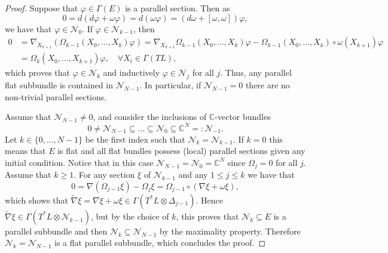 \documentclass{article}
\theoremstyle{remark}
\begin{document}
\begin{proof}
    Suppose that $\varphi\in\Gamma(E)$ is a parallel section. Then as 
    $$0=d(d\varphi+\omega\varphi)=d(\omega\varphi)=(d\omega+[\omega,\omega])\varphi,$$
    we have that $\varphi\in\mathcal{N}_0$. If $\varphi\in\mathcal{N}_{k-1}$, then 
    \begin{align*}
        0&=\nabla_{X_{k+1}}(\Omega_{k-1}(X_0,\ldots,X_k)\varphi)=\nabla_{X_{k+1}}\Omega_{k-1}(X_0,\ldots,X_k)\varphi-\Omega_{k-1}(X_0,\ldots,X_k)\circ\omega(X_{k+1})\varphi\\
        &=\Omega_k(X_0,\ldots,X_{k+1})\varphi,\quad\forall X_i \in\Gamma(TL),
    \end{align*}
    which proves that $\varphi\in \mathcal{N}_k$ and inductively $\varphi\in\mathcal{N}_j$ for all $j$. Thus, any parallel flat subbundle is contained in $\mathcal{N}_{N-1}$. In particular, if $\mathcal{N}_{N-1}=0$ there are no non-trivial parallel sections.
    
    Assume that $\mathcal{N}_{N-1}\neq 0$, and consider the inclusions of $\mathbb{C}$-vector bundles 
    \begin{equation*}
        0\neq\mathcal{N}_{N-1}\subseteq\ldots\subseteq\mathcal{N}_0\subseteq\mathbb{C}^N=:\mathcal{N}_{-1}.
    \end{equation*}
    Let $k\in\{0,\ldots,N-1\}$ be the first index such that $\mathcal{N}_k=\mathcal{N}_{k-1}$. If $k=0$ this means that $E$ is flat and all flat bundles possess (local) parallel sections given any initial condition. Notice that in this case $\mathcal{N}_{N-1}=\mathcal{N}_0=\mathbb{C}^N$ since $\Omega_j=0$ for all $j$. Assume that $k\geq 1$. For any section $\xi$ of $\mathcal{N}_{k-1}$ and any $1\leq j\leq k$ we have that 
    $$0=\nabla(\Omega_{j-1}\xi)-\Omega_j\xi=\Omega_{j-1}\circ(\nabla\xi+\omega\xi),$$
    which shows that $\tilde{\nabla}\xi=\nabla\xi+\omega\xi\in\Gamma(T^{*}L\otimes \Delta_{j-1})$. Hence $\tilde{\nabla}\xi\in\Gamma(T^{*}L\otimes \mathcal{N}_{k-1})$, but by the choice of $k$, this proves that $\mathcal{N}_k\subseteq E$ is a parallel subbundle and then $\mathcal{N}_k\subseteq\mathcal{N}_{N-1}$ by the maximality property. Therefore $\mathcal{N}_k=\mathcal{N}_{N-1}$ is a flat parallel subbundle, which concludes the proof. 
\end{proof}
\end{document}
